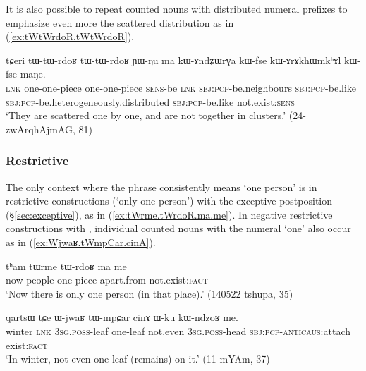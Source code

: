 It is also possible to repeat counted nouns with distributed numeral prefixes to emphasize even more the scattered distribution as in (\ref{ex:tWtWrdoR.tWtWrdoR}).

\begin{exe}
	\ex \label{ex:tWtWrdoR.tWtWrdoR}
	\gll 
	tɕeri tɯ-tɯ-rdoʁ tɯ-tɯ-rdoʁ ɲɯ-ŋu ma kɯ-ɤndʑɯrɣa kɯ-fse kɯ-ɤrɤkhɯmkʰɤl kɯ-fse maŋe.  \\
	\textsc{lnk} one-one-piece one-one-piece \textsc{sens}-be \textsc{lnk}  \textsc{sbj}:\textsc{pcp}-be.neighbours \textsc{sbj}:\textsc{pcp}-be.like \textsc{sbj}:\textsc{pcp}-be.heterogeneously.distributed \textsc{sbj}:\textsc{pcp}-be.like not.exist:\textsc{sens} \\
	\glt  `They are scattered one by one, and are not together in clusters.' (24-zwArqhAjmAG, 81)
\end{exe}


\subsubsection{Restrictive} \label{sec:CN.restrictive}

The only context where the phrase  consistently means `one person' is in restrictive constructions (`only one person') with the exceptive postposition  (§\ref{sec:exceptive}), as in (\ref{ex:tWrme.tWrdoR.ma.me}).  In negative restrictive constructions with , individual counted nouns with the numeral  `one' also occur as in (\ref{ex:Wjwaʁ.tWmpCar.cinA}).

\begin{exe}
	\ex \label{ex:tWrme.tWrdoR.ma.me}
	\gll tʰam tɯrme tɯ-rdoʁ ma me \\
	now people one-piece apart.from not.exist:\textsc{fact} \\
	\glt `Now there is only one person (in that place).' (140522 tshupa, 35)
\end{exe} 

\begin{exe}
	\ex \label{ex:Wjwaʁ.tWmpCar.cinA}
	\gll   qartsɯ tɕe ɯ-jwaʁ tɯ-mpɕar cinɤ ɯ-ku kɯ-ndzoʁ me.  \\
	winter \textsc{lnk} \textsc{3sg}.\textsc{poss}-leaf one-leaf not.even \textsc{3sg}.\textsc{poss}-head \textsc{sbj}:\textsc{pcp}-\textsc{anticaus}:attach exist:\textsc{fact} \\ 
	\glt `In winter, not even one leaf (remains) on it.' (11-mYAm, 37)
\end{exe} 

